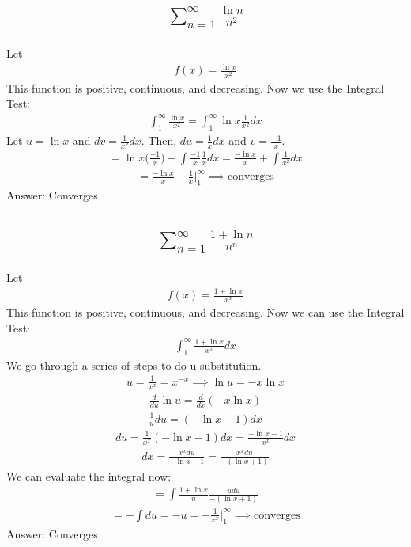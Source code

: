 \documentclass{article}
\begin{document}
\subsection{
	\begin{align*}
		\sum_{n = 1}^\infty \frac{\ln{n}}{n^2}
	\end{align*}
}
Let 
\begin{align*}
	f(x) = \frac{\ln{x}}{x^2}
\end{align*}
This function is positive, continuous, and decreasing. Now we use the Integral Test:
\begin{align*}
	\int_1^\infty{\frac{\ln{x}}{x^2}} = \int_1^\infty {\ln{x} \frac{1}{x^2} dx}
\end{align*}
Let $u = \ln{x}$ and $dv = \frac{1}{x^2} dx$. Then, $du = \frac{1}{x}
 dx$ and $v = \frac{-1}{x}$. 
 \begin{align*}
 	= \ln{x} \bigg( \frac{-1}{x} \bigg) - \int{\frac{-1}{x} \frac{1}{x} dx} = \frac{-\ln{x}}{x} + \int{\frac{1}{x^2} dx}
 \end{align*}
 \begin{align*}
 	= \frac{-\ln{x}}{x} - \frac{1}{x} \bigg|_1^\infty \implies \text{converges}
 \end{align*}
 Answer: Converges
\subsection{
	\begin{align*}
		\sum_{n = 1}^\infty \frac{1 + \ln{n}}{n^n}
	\end{align*}
}
Let 
\begin{align*}
	f(x) = \frac{1 + \ln{x}}{x^x}
\end{align*}
This function is positive, continuous, and decreasing. Now we can use the Integral Test:
\begin{align*}
	\int_1^\infty {\frac{1 + \ln{x}}{x^x} dx}
\end{align*}
We go through a series of steps to do u-substitution.
\begin{align*}
	u = \frac{1}{x^x} = x^{-x} \implies \ln{u} = -x\ln{x}
\end{align*}
\begin{align*}
	\frac{d}{du} \ln{u} = \frac{d}{dx} (-x \ln{x})
\end{align*}
\begin{align*}
	\frac{1}{u} du = (-\ln{x} - 1 )dx
\end{align*}
\begin{align*}
	du = \frac{1}{x^x} (-\ln{x} - 1) dx = \frac{-\ln{x} - 1}{x^x} dx
\end{align*}
\begin{align*}
	dx = \frac{x^x du}{-\ln{x} - 1} = \frac{x^x du}{-(\ln{x} + 1)}
\end{align*}
We can evaluate the integral now:
\begin{align*}
	= \int{\frac{1 + \ln{x}}{u} \frac{u du}{-(\ln{x} + 1)}}
\end{align*}
\begin{align*}
	= -\int{du} = -u = -\frac{1}{x^x} \bigg|_1^\infty \implies \text{converges}
\end{align*}
Answer: Converges
\end{document}
